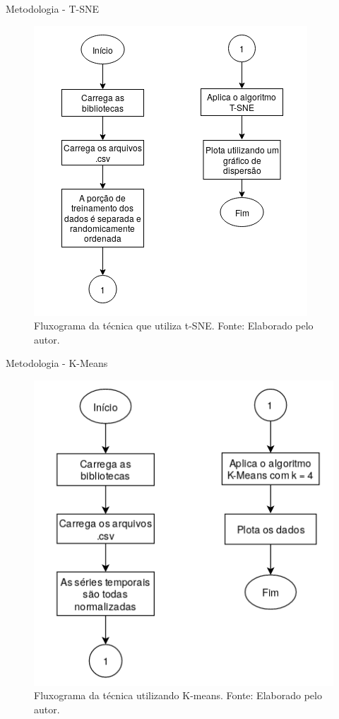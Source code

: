 \documentclass[aspectratio=169]{beamer}
\begin{document}
\begin{frame}{Metodologia - T-SNE}
	\begin{figure}[HT]
		\begin{center}
			\includegraphics[scale=.42]{../metodologia/img/t-sne.png}
			\caption{Fluxograma da técnica que utiliza t-SNE. \newline
			Fonte: Elaborado pelo autor.}
			\label{fig:t-sne}
		\end{center}
	\end{figure}
\end{frame}


\begin{frame}{Metodologia - K-Means}
	\begin{figure}[HT]
		\begin{center}
			\includegraphics[scale=.4]{../metodologia/img/k-means.png}
			\caption{Fluxograma da técnica utilizando K-means. \newline
			Fonte: Elaborado pelo autor.}
			\label{fig:k-means}
		\end{center}
	\end{figure}
\end{frame}
\end{document}
